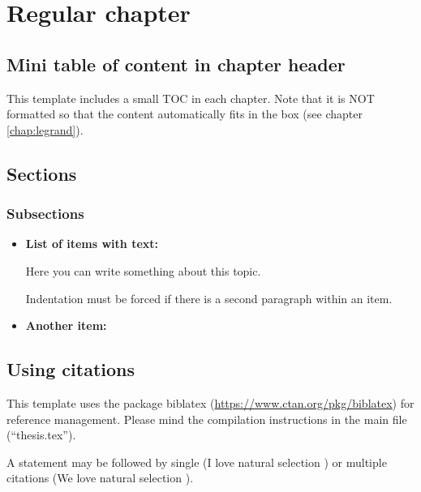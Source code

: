 \documentclass[11pt,fleqn]{book} %
\begin{document}
\graphicspath{ {../../Images/}}
\fi


\chapter{Regular chapter \label{chap:main}}

\section{Mini table of content in chapter header}
This template includes a small TOC in each chapter. Note that it is NOT formatted so that the content
automatically fits in the box (see chapter \ref{chap:legrand}).


\section{Sections}
\subsection{Subsections}

\begin{itemize}

\item \textbf {\sffamily \footnotesize List of items with text:}
 
Here you can write something about this topic. 

\hspace{15pt} Indentation must be forced if there is a second paragraph within an item.

\item \textbf {\sffamily \footnotesize Another item:}

\lipsum[1]

\end{itemize}

\section{Using citations}

This template uses the package biblatex (\url{https://www.ctan.org/pkg/biblatex})
for reference management. Please mind the compilation instructions in
the main file (``thesis.tex'').

A statement may be followed by single (I love natural selection \parencite{darwin_origin_1859}) or
multiple citations (We love natural selection \parencite{darwin_tendency_1858, darwin_origin_1859}).
\end{document}
